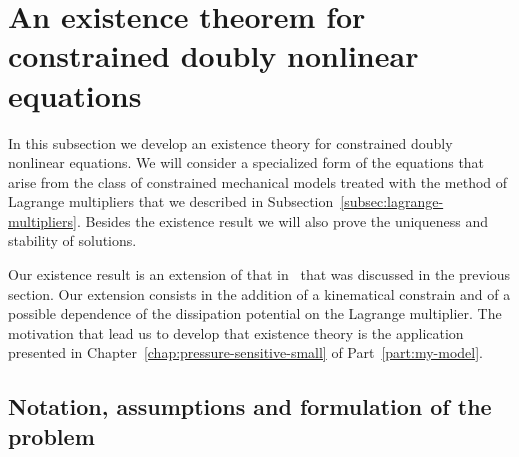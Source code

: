 \documentclass[a4paper,10pt,oneside]{amsbook}
\numberwithin{section}{chapter}
\numberwithin{equation}{chapter}
\theoremstyle{definition}
\begin{document}
\section{An existence theorem for constrained doubly nonlinear equations}
\label{sec:existence-theorem-abstract-constrained}

In this subsection we develop an existence theory for constrained doubly nonlinear equations. We will consider a specialized form of the equations that arise from the class of constrained mechanical models treated with the method of Lagrange multipliers that we described in Subsection~\ref{subsec:lagrange-multipliers}. Besides the existence result we will also prove the uniqueness and stability of solutions.

Our existence result is an extension of that in~\cite[Proposition 11.1]{roubicek-pde} that was discussed in the previous section. Our extension consists in the addition of a kinematical constrain and of a possible dependence of the dissipation potential on the Lagrange multiplier. The motivation that lead us to develop that existence theory is the application presented in Chapter~\ref{chap:pressure-sensitive-small} of Part~\ref{part:my-model}.

\subsection{Notation, assumptions and formulation of the problem}
\end{document}

